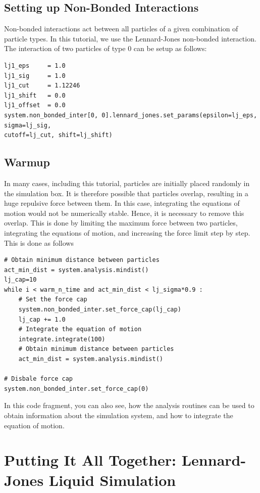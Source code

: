 \documentclass[
paper=a4,                       %
fontsize=11pt,                  %
twoside,                        %
footsepline,                    %
headsepline,                    %
headinclude=false,              %
footinclude=false,              %
pagesize,                       %
]{scrartcl}
\begin{document}
\subsection{Setting up Non-Bonded Interactions}

Non-bonded interactions act between all particles of a given combination of particle types.
In this tutorial, we use the Lennard-Jones non-bonded interaction.
The interaction of two particles of type 0 can be setup as follows:
{\small\vspace{0,2cm}
\begin{lstlisting}
lj1_eps     = 1.0
lj1_sig     = 1.0
lj1_cut     = 1.12246
lj1_shift   = 0.0
lj1_offset  = 0.0
system.non_bonded_inter[0, 0].lennard_jones.set_params(epsilon=lj_eps, sigma=lj_sig,
cutoff=lj_cut, shift=lj_shift)
\end{lstlisting}
}\vspace{0,2cm}


\subsection{Warmup}

In many cases, including this tutorial, particles are initially placed randomly in the simulation box. It is therefore possible that particles overlap, resulting in a huge repulsive force between them. In this case, integrating the equations of motion would not be numerically stable. Hence, it is necessary to remove this overlap.
This is done by limiting the maximum force between two particles, integrating the equations of motion, and increasing the force limit step by step.
This is done as follows
\begin{lstlisting}
# Obtain minimum distance between particles
act_min_dist = system.analysis.mindist()
lj_cap=10
while i < warm_n_time and act_min_dist < lj_sigma*0.9 :
    # Set the force cap
    system.non_bonded_inter.set_force_cap(lj_cap)
    lj_cap += 1.0
    # Integrate the equation of motion
    integrate.integrate(100)
    # Obtain minimum distance between particles
    act_min_dist = system.analysis.mindist()

# Disbale force cap
system.non_bonded_inter.set_force_cap(0)
\end{lstlisting}
In this code fragment, you can also see, how the analysis routines can be used to obtain information about the simulation system, and how to integrate the equation of motion.


\section{Putting It All Together: Lennard-Jones Liquid Simulation}
\end{document}
